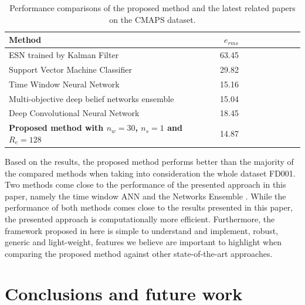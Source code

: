 \documentclass[12pt]{IEEEtran}%
\begin{document}
\begin{table}[!htb]
\centering
\begin{tabular}{l | r r r r | r r r r}
	\hline	
	Method & $e_{rms}$ \\
  	\hline
  	ESN trained by Kalman Filter \cite{Peng2012} & 63.45\\
  	Support Vector Machine Classifier \cite{Louen2013} & 29.82\\
  	Time Window Neural Network \cite{Lim2016} & 15.16\\
  	Multi-objective deep belief networks ensemble \cite{Zhang2016} & 15.04\\
  	Deep Convolutional Neural Network \cite{Babu2016} & 18.45\\
  	\textbf{Proposed method with $n_w = 30$, $n_s=1$ and $R_e = 128$} & 14.87\\
  	\hline
\end{tabular}
\caption{Performance comparisons of the proposed method and the latest related papers on the CMAPS dataset.}
\label{table:results_comparison}
\end{table}

Based on the results, the proposed method performs better than the majority of the compared methods when taking into consideration the whole dataset FD001. Two methods come close to the performance of the presented approach in this paper, namely the time window ANN \cite{Lim2016} and the Networks Ensemble \cite{Zhang2016}. While the performance of both methods comes close to the results presented in this paper, the presented approach is computationally more efficient. Furthermore, the framework proposed in here is simple to understand and implement, robust, generic and light-weight, features we believe are important to highlight when comparing the proposed method against other state-of-the-art approaches.


\section{Conclusions and future work}
\label{sec:conclusions}
\end{document}
